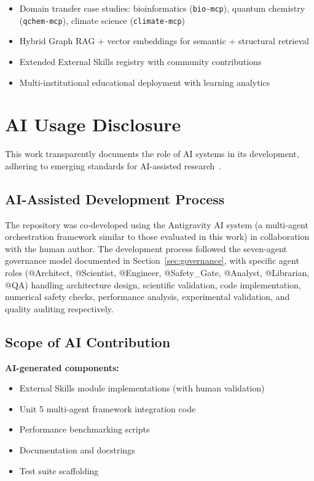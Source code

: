 \documentclass[11pt]{article}
\newcommand{\code}[1]{\texttt{#1}}
\begin{document}
\begin{itemize}
    \item Domain transfer case studies: bioinformatics (\code{bio-mcp}), quantum chemistry (\code{qchem-mcp}), climate science (\code{climate-mcp})
    \item Hybrid Graph RAG + vector embeddings for semantic + structural retrieval
    \item Extended External Skills registry with community contributions
    \item Multi-institutional educational deployment with learning analytics
\end{itemize}

\section{AI Usage Disclosure}

This work transparently documents the role of AI systems in its development, adhering to emerging standards for AI-assisted research~\cite{MetaGPT2023}.

\subsection{AI-Assisted Development Process}

The repository was co-developed using the Antigravity AI system (a multi-agent orchestration framework similar to those evaluated in this work) in collaboration with the human author. The development process followed the seven-agent governance model documented in Section~\ref{sec:governance}, with specific agent roles (@Architect, @Scientist, @Engineer, @Safety\_Gate, @Analyst, @Librarian, @QA) handling architecture design, scientific validation, code implementation, numerical safety checks, performance analysis, experimental validation, and quality auditing respectively.

\subsection{Scope of AI Contribution}

\textbf{AI-generated components:}
\begin{itemize}
    \item External Skills module implementations (with human validation)
    \item Unit 5 multi-agent framework integration code
    \item Performance benchmarking scripts
    \item Documentation and docstrings
    \item Test suite scaffolding
\end{itemize}
\end{document}
